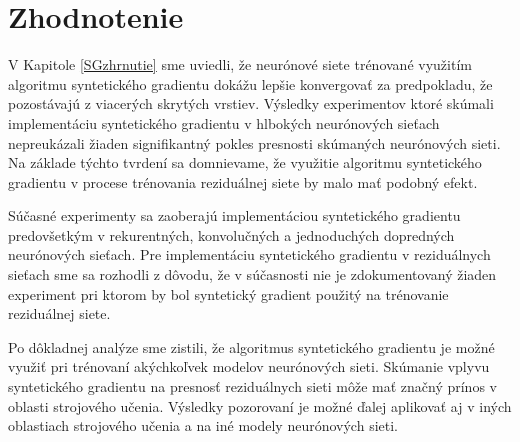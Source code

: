 \chapter{Zhodnotenie}

V Kapitole \ref{SGzhrnutie} sme uviedli, že neurónové siete trénované využitím algoritmu syntetického gradientu dokážu lepšie konvergovať za predpokladu, že pozostávajú z viacerých skrytých vrstiev. Výsledky experimentov ktoré skúmali implementáciu syntetického gradientu v hlbokých neurónových sieťach nepreukázali žiaden signifikantný pokles presnosti skúmaných neurónových sieti. Na základe týchto tvrdení sa domnievame, že využitie algoritmu syntetického gradientu v procese trénovania reziduálnej siete by malo mať podobný efekt. 

Súčasné experimenty sa zaoberajú implementáciou syntetického gradientu predovšetkým v rekurentných, konvolučných a jednoduchých dopredných neurónových sieťach. Pre implementáciu syntetického gradientu v reziduálnych sieťach sme sa rozhodli z dôvodu, že v súčasnosti nie je zdokumentovaný žiaden experiment pri ktorom by bol syntetický gradient použitý na trénovanie reziduálnej siete. 

Po dôkladnej analýze sme zistili, že algoritmus syntetického gradientu je možné využiť pri trénovaní akýchkoľvek modelov neurónových sieti. Skúmanie vplyvu syntetického gradientu na presnosť reziduálnych sieti môže mať značný prínos v oblasti strojového učenia. Výsledky pozorovaní je možné ďalej aplikovať aj v iných oblastiach strojového učenia a na iné modely neurónových sieti.

